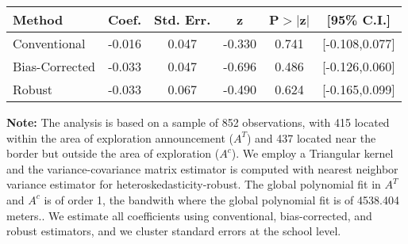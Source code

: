 \begin{table}[htbp]\centering
 \footnotesize 
\begin{tabular}{lccccc}
\hline\hline
Method & Coef. & Std. Err. & z & P$>|$z$|$ & [95\% C.I.] \\ 
\hline \hline  
Conventional & -0.016 & 0.047 & -0.330 & 0.741 & [-0.108,0.077] \\ 
 Bias-Corrected & -0.033 & 0.047 & -0.696 & 0.486 & [-0.126,0.060] \\ 
Robust & -0.033 & 0.067 & -0.490 & 0.624 & [-0.165,0.099] \\ 
  \hline\hline
\end{tabular}
\label{table:rd}
\begin{tablenotes} 
  \justifying \tiny \textbf{Note: }    
   The analysis is based on a sample of 852 observations, with 415 located within the area of exploration announcement ($A^{T}$) and 437 located near the border but outside the area of exploration  ($A^{c}$). 
           We employ a Triangular kernel and the variance-covariance matrix estimator is computed with nearest neighbor variance estimator for heteroskedasticity-robust. The global polynomial fit in  $A^{T}$ and $A^{c}$ is of order 1, the bandwith where the global polynomial fit is of 4538.404 meters.. We estimate all coefficients using conventional, bias-corrected, and robust estimators, and we cluster standard errors at the school level. \end{tablenotes} 
 \end{table} 
